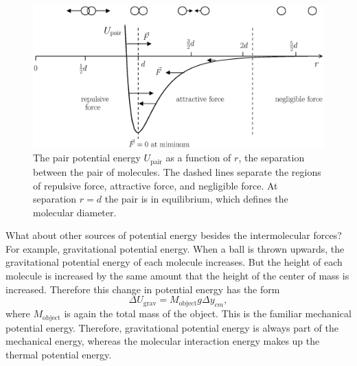 \begin{figure}
\begin{center}
\includegraphics[width=5in]{thermal_energy_and_solids/pair_potential.eps}
\caption{The pair potential energy $U_\text{pair}$ as a function of
  $r$, the separation between the pair of molecules.  The dashed lines
  separate the regions of repulsive force, attractive force, and
  negligible force.  At separation $r=d$ the pair is in equilibrium,
  which defines the molecular diameter.}
\label{fig:pair_potential}
\end{center}
\end{figure}

What about other sources of potential energy besides the
intermolecular forces?  For example, gravitational potential energy.
When a ball is thrown upwards, the gravitational potential energy of
each molecule increases.  But the height of each molecule is increased
by the same amount that the height of the center of mass is increased.
Therefore this change in potential energy has the form
\begin{equation}
\Delta U_\text{grav} = M_\text{object} g\Delta y_{cm},
\end{equation}
where $M_\text{object}$ is again the total mass of the object.  This
is the familiar mechanical potential energy.  Therefore, gravitational
potential energy is always part of the mechanical energy, whereas the
molecular interaction energy makes up the thermal potential energy.

